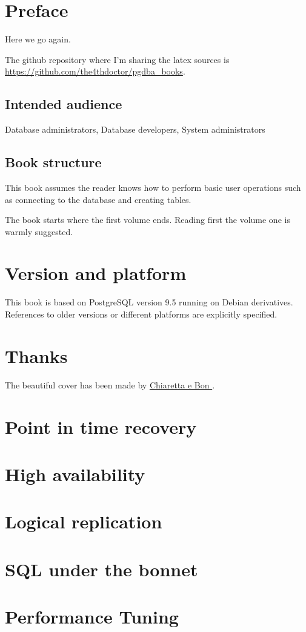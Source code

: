 \documentclass[twoside]{book}
\begin{document}
 



\chapter*{Preface}
Here we go again.


The github repository where I'm sharing the latex sources  is 
\href{https://github.com/the4thdoctor/pgdba\_books}{
https://github.com/the4thdoctor/pgdba\_books}.\newline


\section*{Intended audience}
Database administrators,  Database developers, System administrators

\section*{Book structure}
This book assumes the reader knows how to perform basic user operations such as
connecting to the database and creating tables.\newline

The book starts where the first volume ends. Reading first the volume one is warmly suggested.\newline


\chapter*{Version and platform}
This book is based on PostgreSQL version 9.5 running on Debian derivatives.
References to older versions or different platforms are explicitly specified.

\chapter*{Thanks}
The beautiful cover has been made by \href{http://www.bonland.eu/}{Chiaretta e Bon }.\newline

\tableofcontents{}






\chapter{Point in time recovery}
\chapter{High availability}
\chapter{Logical replication}
\chapter{SQL under the bonnet}
\chapter{Performance Tuning}

\appendix

\listoffigures
\listoftables
\printindex{}
\end{document}
